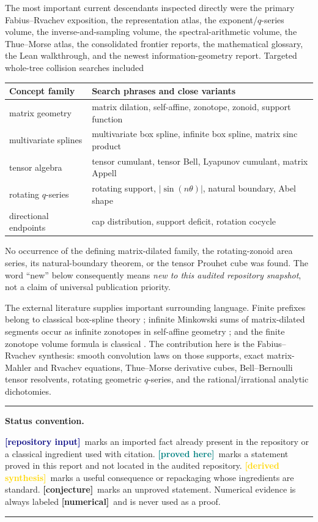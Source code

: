 \documentclass[11pt,oneside]{article}
\theoremstyle{definition}
\theoremstyle{remark}
\newcommand{\Repo}{\textcolor{navy}{\textbf{[repository input]}}}
\newcommand{\New}{\textcolor{teal}{\textbf{[proved here]}}}
\newcommand{\Derived}{\textcolor{gold}{\textbf{[derived synthesis]}}}
\newcommand{\Conj}{\textcolor{burgundy}{\textbf{[conjecture]}}}
\newcommand{\Num}{\textcolor{burgundy}{\textbf{[numerical]}}}
\newenvironment{statusbox}[1]{%
  \par\medskip\noindent\begin{center}\begin{minipage}{0.94\textwidth}
  \hrule\vspace{0.55em}\textbf{#1.}\quad
}{%
  \vspace{0.55em}\hrule\end{minipage}\end{center}\medskip
}
\begin{document}
The most important current descendants inspected directly were the primary
Fabius--Rvachev exposition, the representation atlas, the exponent/$q$-series
volume, the inverse-and-sampling volume, the spectral-arithmetic volume, the
Thue--Morse atlas, the consolidated frontier reports, the mathematical glossary,
the Lean walkthrough, and the newest information-geometry report.  Targeted
whole-tree collision searches included
\begin{center}
\begin{tabular}{@{}ll@{}}
\toprule
Concept family & Search phrases and close variants \\
\midrule
matrix geometry & matrix dilation, self-affine, zonotope, zonoid, support function \\
multivariate splines & multivariate box spline, infinite box spline, matrix sinc product \\
tensor algebra & tensor cumulant, tensor Bell, Lyapunov cumulant, matrix Appell \\
rotating $q$-series & rotating support, $|\sin(n\theta)|$, natural boundary, Abel shape \\
directional endpoints & cap distribution, support deficit, rotation cocycle \\
\bottomrule
\end{tabular}
\end{center}
No occurrence of the defining matrix-dilated family, the rotating-zonoid area
series, its natural-boundary theorem, or the tensor Prouhet cube was found.  The
word ``new'' below consequently means \emph{new to this audited repository
snapshot}, not a claim of universal publication priority.

The external literature supplies important surrounding language.  Finite
prefixes belong to classical box-spline theory \cite{deBoorBoxSplines}; infinite
Minkowski sums of matrix-dilated segments occur as infinite zonotopes in
self-affine geometry \cite{ProtasovZaitseva}; and the finite zonotope volume
formula is classical \cite{GoverKrikorian}.  The contribution here is the
Fabius--Rvachev synthesis: smooth convolution laws on those supports, exact
matrix-Mahler and Rvachev equations, Thue--Morse derivative cubes,
Bell--Bernoulli tensor resolvents, rotating geometric $q$-series, and the
rational/irrational analytic dichotomies.

\begin{statusbox}{Status convention}
\Repo\ marks an imported fact already present in the repository or a classical
ingredient used with citation.  \New\ marks a statement proved in this report and
not located in the audited repository.  \Derived\ marks a useful consequence or
repackaging whose ingredients are standard.  \Conj\ marks an unproved statement.
Numerical evidence is always labeled \Num\ and is never used as a proof.
\end{statusbox}
\end{document}
